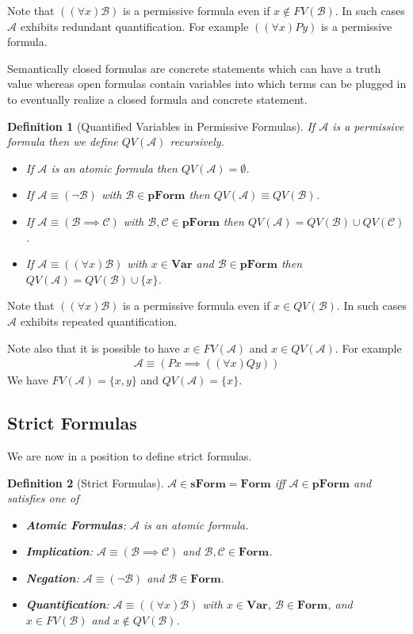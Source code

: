 \documentclass[12pt]{article}
\theoremstyle{break}
\newtheorem{definition}{Definition}[section]
\theoremstyle{break}
\theoremstyle{break}
\theoremstyle{break}
\theoremstyle{break}
\newtheorem{informal definition}[definition]{Informal Definition}
\newcommand{\mc}[1]{\mathcal{#1}}
\begin{document}
Note that $((\forall x) \mc{B})$ is a permissive formula even if $x\not \in FV(\mc{B})$.
In such cases $\mc{A}$ exhibits redundant quantification.
For example $((\forall x) Py)$ is a permissive formula.

Semantically closed formulas are concrete statements which can have a truth value whereas open formulas contain variables into which terms can be plugged in to eventually realize a closed formula and concrete statement.

\begin{definition}[Quantified Variables in Permissive Formulas]
If $\mc{A}$ is a permissive formula then we define $QV(\mc{A})$ recursively.

\begin{itemize}
\item{If $\mc{A}$ is an atomic formula then $QV(\mc{A}) = \emptyset$.}
\item{If $\mc{A} \equiv (\lnot \mc{B})$ with $\mc{B}\in\textbf{pForm}$ then $QV(\mc{A}) \equiv QV(\mc{B})$.}
\item{If $\mc{A} \equiv (\mc{B} \implies \mc{C})$ with $\mc{B}, \mc{C}\in\textbf{pForm}$ then $QV(\mc{A}) = QV(\mc{B}) \cup QV(\mc{C})$.}
\item{If $\mc{A} \equiv ((\forall x) \mc{B})$ with $x\in\textbf{Var}$ and $\mc{B}\in\textbf{pForm}$ then $QV(\mc{A}) = QV(\mc{B}) \cup \{x\}$.}
\end{itemize}
\end{definition}

Note that $((\forall x)\mc{B})$ is a permissive formula even if $x\in QV(\mc{B})$.
In such cases $\mc{A}$ exhibits repeated quantification.

Note also that it is possible to have $x\in FV(\mc{A})$ and $x\in QV(\mc{A})$.
For example
\begin{align}
\mc{A} \equiv (Px \implies ((\forall x) Qy))
\end{align}
We have $FV(\mc{A}) = \{x, y\}$ and $QV(\mc{A}) = \{x\}$.

\subsection{Strict Formulas}

We are now in a position to define strict formulas.
\begin{definition}[Strict Formulas]
$\mc{A}\in\textbf{sForm} = \textbf{Form}$ iff $\mc{A} \in \textbf{pForm}$ and satisfies one of
\begin{itemize}
\item{\textbf{Atomic Formulas}: $\mc{A}$ is an atomic formula.}
\item{\textbf{Implication}: $\mc{A} \equiv (\mc{B} \implies \mc{C})$ and $\mc{B}, \mc{C} \in \textbf{Form}$.}
\item{\textbf{Negation}: $\mc{A} \equiv (\lnot \mc{B})$ and $\mc{B}\in\textbf{Form}$.}
\item{\textbf{Quantification}: $\mc{A} \equiv ((\forall x)\mc{B})$ with $x\in\textbf{Var}$, $\mc{B}\in\textbf{Form}$, and $x\in FV(\mc{B})$ and $x\not\in QV(\mc{B})$.}
\end{itemize}
\end{definition}
\end{document}
